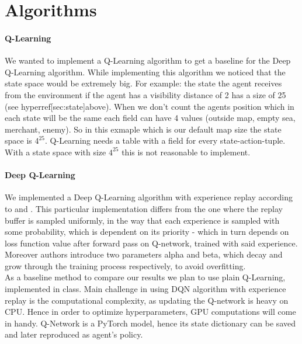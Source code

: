 \documentclass[11pt]{article} %
\begin{document}
\section{Algorithms}
\paragraph{Q-Learning}
We wanted to implement a Q-Learning algorithm to get a baseline for the Deep Q-Learning algorithm. While implementing this algorithm we noticed that the state space would be extremely big. For example: the state the agent receives from the environment if the agent has a visibility distance of 2 has a size of 25 (see hyperref[sec:state]{above}). When we don't count the agents position which in each state will be the same each field can have 4 values (outside map, empty sea, merchant, enemy). So in this exmaple which is our default map size the state space is $4^25$. Q-Learning needs a table with a field for every state-action-tuple. With a state space with size $4^25$ this is not reasonable to implement. 

\paragraph{Deep Q-Learning} 
We implemented a Deep Q-Learning algorithm with experience replay according to \cite{schaul_2016} and \cite{crabe_2020}. This particular implementation differs from the one where the replay buffer is sampled uniformly, in the way that each experience is sampled with some probability, which is dependent on its priority - which in turn depends on loss function value after forward pass on Q-network, trained with said experience. Moreover authors introduce two parameters alpha and beta, which decay and grow through the training process respectively, to avoid overfitting. \\
As a baseline method to compare our results we plan to use plain Q-Learning, implemented in class. Main challenge in using DQN algorithm with experience replay is the computational complexity, as updating the Q-network is heavy on CPU. Hence in order to optimize hyperparameters, GPU computations will come in handy. Q-Network is a PyTorch model, hence its state dictionary can be saved and later reproduced as agent's policy.
\end{document}
